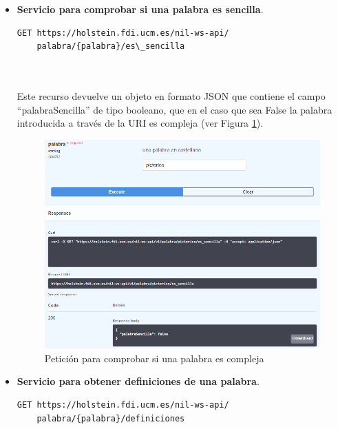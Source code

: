 \begin{itemize}
	\item \textbf{Servicio para comprobar si una palabra es sencilla}.
	\begin{lstlisting}[backgroundcolor = \color{pink},
	xleftmargin = 1cm,
	framexleftmargin = 1em,frame=tlbr,framesep=4pt,framerule=1pt]
	GET https://holstein.fdi.ucm.es/nil-ws-api/
	palabra/{palabra}/es\_sencilla
	
	
\end{lstlisting}
	
	Este recurso devuelve un objeto en formato JSON que contiene el campo ``palabraSencilla'' de tipo booleano, que en el caso que sea False la palabra introducida a través de la URI es compleja (ver Figura \ref{fig:apiSencilla}).
		 \begin{figure}[h!]
		\centering
		
		
		\includegraphics[scale=1]{Imagenes/Figuras/APISencilla}
		
		
		\caption{Petición para comprobar si una palabra es compleja}
		\label{fig:apiSencilla}
	\end{figure}
	\item \textbf{Servicio para obtener definiciones de una palabra}.


	\begin{lstlisting}[backgroundcolor = \color{pink},
	xleftmargin = 1cm,
	framexleftmargin = 1em,frame=tlbr,framesep=4pt,framerule=1pt]
	GET https://holstein.fdi.ucm.es/nil-ws-api/
	palabra/{palabra}/definiciones

	
	
\end{lstlisting}





\end{itemize}
